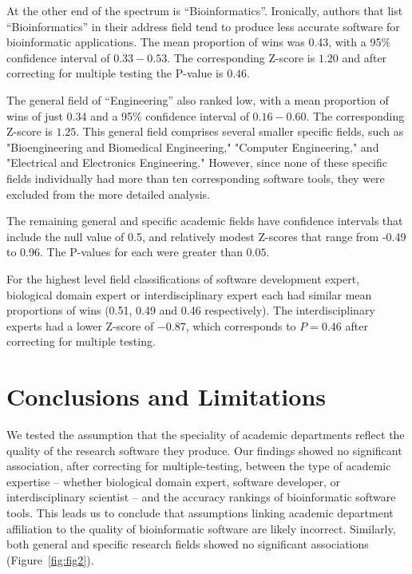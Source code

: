 \documentclass[fleqn,10pt,doc,onecolumn]{SelfArx}%
\begin{document}
At the other end of the spectrum is ``Bioinformatics''. Ironically,
authors that list ``Bioinformatics'' in their address field tend to
produce less accurate software for bioinformatic applications. The
mean proportion of wins was 0.43, with a 95\% confidence interval of
$0.33-0.53$. The corresponding Z-score is $1.20$ and after correcting
for multiple testing the P-value is $0.46$.


The general field of ``Engineering'' also ranked low, with a mean
proportion of wins of just 0.34 and a 95\% confidence interval of
$0.16-0.60$. The corresponding Z-score is $1.25$. This general field
comprises several smaller specific fields, such as "Bioengineering and
Biomedical Engineering," "Computer Engineering," and "Electrical and
Electronics Engineering." However, since none of these specific fields
individually had more than ten corresponding software tools, they were
excluded from the more detailed analysis.

The remaining general and specific academic fields have confidence
intervals that include the null value of 0.5, and relatively modest
Z-scores that range from -0.49 to 0.96. The P-values for each were
greater than $0.05$. 

For the highest level field classifications of software development
expert, biological domain expert or interdisciplinary expert each had
similar mean proportions of wins (0.51, 0.49 and 0.46
respectively). The interdisciplinary experts had a lower Z-score of
$-0.87$, which corresponds to $P=0.46$ after correcting for multiple
testing.


\section*{Conclusions and Limitations}

We tested the assumption that the speciality of academic departments
reflect the quality of the research software they produce. Our
findings showed no significant association, after correcting for
multiple-testing, between the type of academic expertise -- whether
biological domain expert, software developer, or interdisciplinary
scientist -- and the accuracy rankings of bioinformatic software
tools. This leads us to conclude that assumptions linking academic
department affiliation to the quality of bioinformatic software are
likely incorrect. Similarly, both general and specific research fields
showed no significant associations (Figure~\ref{fig:fig2}).
\end{document}
